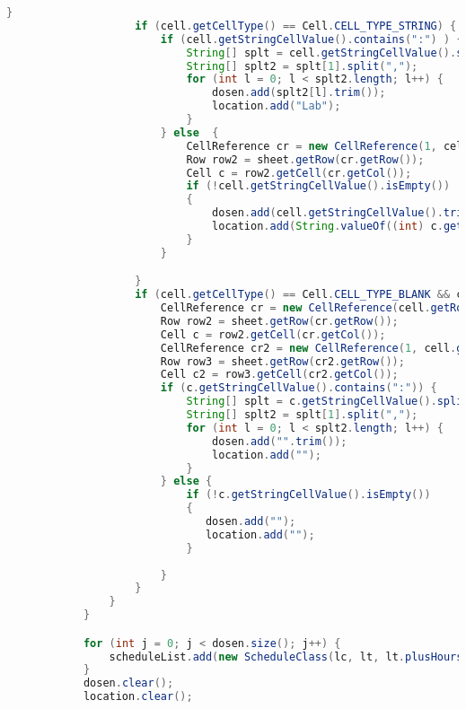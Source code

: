 \begin{lstlisting}[language=Java,basicstyle=\tiny,caption=ExcelConverter.java,label=lst:ExcelConverter]
                    }
                    if (cell.getCellType() == Cell.CELL_TYPE_STRING) {
                        if (cell.getStringCellValue().contains(":") ) {
                            String[] splt = cell.getStringCellValue().split(":");
                            String[] splt2 = splt[1].split(",");
                            for (int l = 0; l < splt2.length; l++) {
                                dosen.add(splt2[l].trim());
                                location.add("Lab");
                            }
                        } else  {
                            CellReference cr = new CellReference(1, cell.getColumnIndex());
                            Row row2 = sheet.getRow(cr.getRow());
                            Cell c = row2.getCell(cr.getCol());
                            if (!cell.getStringCellValue().isEmpty())
                            {
                                dosen.add(cell.getStringCellValue().trim());
                                location.add(String.valueOf((int) c.getNumericCellValue()).trim());
                            }
                        }

                    }
                    if (cell.getCellType() == Cell.CELL_TYPE_BLANK && cell.getRowIndex() > 2) {
                        CellReference cr = new CellReference(cell.getRowIndex() - 1, cell.getColumnIndex());
                        Row row2 = sheet.getRow(cr.getRow());
                        Cell c = row2.getCell(cr.getCol());
                        CellReference cr2 = new CellReference(1, cell.getColumnIndex());
                        Row row3 = sheet.getRow(cr2.getRow());
                        Cell c2 = row3.getCell(cr2.getCol());
                        if (c.getStringCellValue().contains(":")) {
                            String[] splt = c.getStringCellValue().split(":");
                            String[] splt2 = splt[1].split(",");
                            for (int l = 0; l < splt2.length; l++) {
                                dosen.add("".trim());
                                location.add("");
                            }
                        } else {
                            if (!c.getStringCellValue().isEmpty())
                            {
                               dosen.add("");
                               location.add("");
                            }
                           
                        }
                    }
                }       
            }

            for (int j = 0; j < dosen.size(); j++) {
                scheduleList.add(new ScheduleClass(lc, lt, lt.plusHours(2), subject, dosen.get(j), location.get(j)));
            }
            dosen.clear();
            location.clear();
           

\end{lstlisting}
